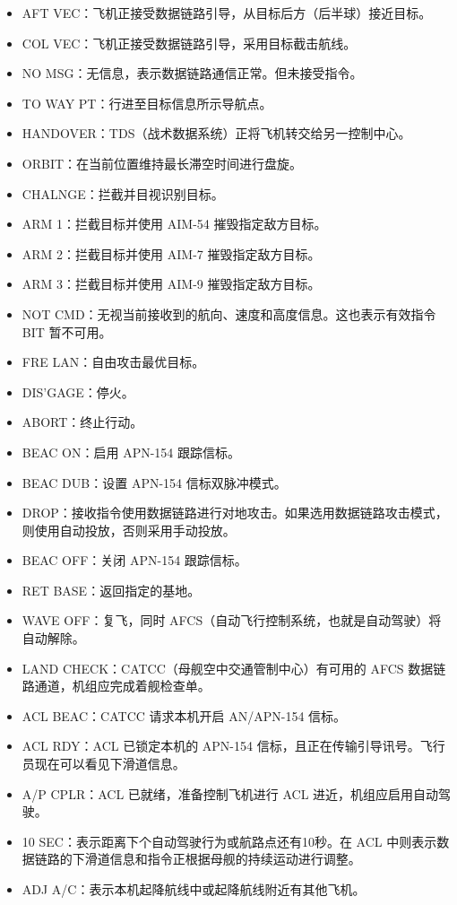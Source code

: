 \begin{itemize}
	\item AFT VEC：飞机正接受数据链路引导，从目标后方（后半球）接近目标。
	\item COL VEC：飞机正接受数据链路引导，采用目标截击航线。
	\item NO MSG：无信息，表示数据链路通信正常。但未接受指令。
	\item TO WAY PT：行进至目标信息所示导航点。
	\item HANDOVER：TDS（战术数据系统）正将飞机转交给另一控制中心。
	\item ORBIT：在当前位置维持最长滞空时间进行盘旋。
	\item CHALNGE：拦截并目视识别目标。
	\item ARM 1：拦截目标并使用 AIM-54 摧毁指定敌方目标。
	\item ARM 2：拦截目标并使用 AIM-7 摧毁指定敌方目标。
	\item ARM 3：拦截目标并使用 AIM-9 摧毁指定敌方目标。
	\item NOT CMD：无视当前接收到的航向、速度和高度信息。这也表示有效指令 BIT 暂不可用。
	\item FRE LAN：自由攻击最优目标。
	\item DIS’GAGE：停火。
	\item ABORT：终止行动。
	\item BEAC ON：启用 APN-154 跟踪信标。
	\item BEAC DUB：设置 APN-154 信标双脉冲模式。
	\item DROP：接收指令使用数据链路进行对地攻击。如果选用数据链路攻击模式，则使用自动投放，否则采用手动投放。
	\item BEAC OFF：关闭 APN-154 跟踪信标。
	\item RET BASE：返回指定的基地。
	\item WAVE OFF：复飞，同时 AFCS（自动飞行控制系统，也就是自动驾驶）将自动解除。
	\item LAND CHECK：CATCC（母舰空中交通管制中心）有可用的 AFCS 数据链路通道，机组应完成着舰检查单。
	\item ACL BEAC：CATCC 请求本机开启 AN/APN-154 信标。
	\item ACL RDY：ACL 已锁定本机的 APN-154 信标，且正在传输引导讯号。飞行员现在可以看见下滑道信息。
	\item A/P CPLR：ACL 已就绪，准备控制飞机进行 ACL 进近，机组应启用自动驾驶。
	\item 10 SEC：表示距离下个自动驾驶行为或航路点还有10秒。在 ACL 中则表示数据链路的下滑道信息和指令正根据母舰的持续运动进行调整。
	\item ADJ A/C：表示本机起降航线中或起降航线附近有其他飞机。

\end{itemize}
